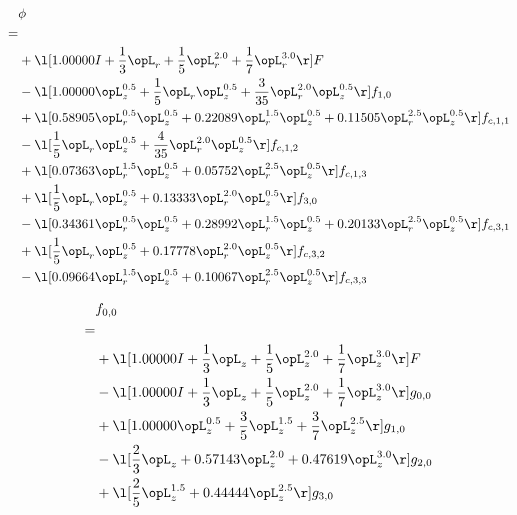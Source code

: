 \begin{alignat}{2} 
\label{eq:scalarFlux_0} 
& \phi \nonumber \\ 
 = \\ 
& + \l[  1.00000 I + \frac{1}{3} \opL_r + \frac{1}{5} \opL_r^{2.0} + \frac{1}{7} \opL_r^{3.0}  \r] F \nonumber \\ 
& - \l[  1.00000 \opL_z^{0.5} + \frac{1}{5} \opL_r \opL_z^{0.5} + \frac{3}{35} \opL_r^{2.0} \opL_z^{0.5}  \r] f_{1,0} \nonumber \\ 
& + \l[  0.58905 \opL_r^{0.5} \opL_z^{0.5} +  0.22089 \opL_r^{1.5} \opL_z^{0.5} +  0.11505 \opL_r^{2.5} \opL_z^{0.5}  \r] f_{c,1,1} \nonumber \\ 
& - \l[ \frac{1}{5} \opL_r \opL_z^{0.5} + \frac{4}{35} \opL_r^{2.0} \opL_z^{0.5}  \r] f_{c,1,2} \nonumber \\ 
& + \l[  0.07363 \opL_r^{1.5} \opL_z^{0.5} +  0.05752 \opL_r^{2.5} \opL_z^{0.5}  \r] f_{c,1,3} \nonumber \\ 
& + \l[ \frac{1}{5} \opL_r \opL_z^{0.5} +  0.13333 \opL_r^{2.0} \opL_z^{0.5}  \r] f_{3,0} \nonumber \\ 
& - \l[  0.34361 \opL_r^{0.5} \opL_z^{0.5} +  0.28992 \opL_r^{1.5} \opL_z^{0.5} +  0.20133 \opL_r^{2.5} \opL_z^{0.5}  \r] f_{c,3,1} \nonumber \\ 
& + \l[ \frac{1}{5} \opL_r \opL_z^{0.5} +  0.17778 \opL_r^{2.0} \opL_z^{0.5}  \r] f_{c,3,2} \nonumber \\ 
& - \l[  0.09664 \opL_r^{1.5} \opL_z^{0.5} +  0.10067 \opL_r^{2.5} \opL_z^{0.5}  \r] f_{c,3,3} \nonumber \\ 
\end{alignat} 


\begin{alignat}{2} 
\label{eq:f_00_0} 
& f_{0,0} \nonumber \\ 
 = \\ 
& + \l[  1.00000 I + \frac{1}{3} \opL_z + \frac{1}{5} \opL_z^{2.0} + \frac{1}{7} \opL_z^{3.0}  \r] F \nonumber \\ 
& - \l[  1.00000 I + \frac{1}{3} \opL_z + \frac{1}{5} \opL_z^{2.0} + \frac{1}{7} \opL_z^{3.0}  \r] g_{0,0} \nonumber \\ 
& + \l[  1.00000 \opL_z^{0.5} + \frac{3}{5} \opL_z^{1.5} + \frac{3}{7} \opL_z^{2.5}  \r] g_{1,0} \nonumber \\ 
& - \l[ \frac{2}{3} \opL_z +  0.57143 \opL_z^{2.0} +  0.47619 \opL_z^{3.0}  \r] g_{2,0} \nonumber \\ 
& + \l[ \frac{2}{5} \opL_z^{1.5} +  0.44444 \opL_z^{2.5}  \r] g_{3,0} \nonumber \\ 
\end{alignat} 


